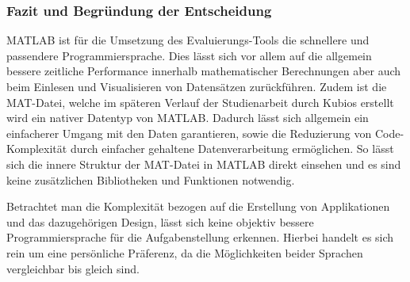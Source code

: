 \subsubsection{Fazit und Begründung der Entscheidung}

MATLAB ist für die Umsetzung des Evaluierungs-Tools die schnellere und passendere Programmiersprache. Dies lässt sich vor allem auf die allgemein bessere zeitliche Performance innerhalb mathematischer Berechnungen aber auch beim Einlesen und Visualisieren von Datensätzen zurückführen. Zudem ist die MAT-Datei, welche im späteren Verlauf der Studienarbeit durch Kubios erstellt wird ein nativer Datentyp von MATLAB. Dadurch lässt sich allgemein ein einfacherer Umgang mit den Daten garantieren, sowie die Reduzierung von Code-Komplexität durch einfacher gehaltene Datenverarbeitung ermöglichen. So lässt sich die innere Struktur der MAT-Datei in MATLAB direkt einsehen und es sind keine zusätzlichen Bibliotheken und Funktionen notwendig.

Betrachtet man die Komplexität bezogen auf die Erstellung von Applikationen und das dazugehörigen Design, lässt sich keine objektiv bessere Programmiersprache für die Aufgabenstellung erkennen. Hierbei handelt es sich rein um eine persönliche Präferenz, da die Möglichkeiten beider Sprachen vergleichbar bis gleich sind.